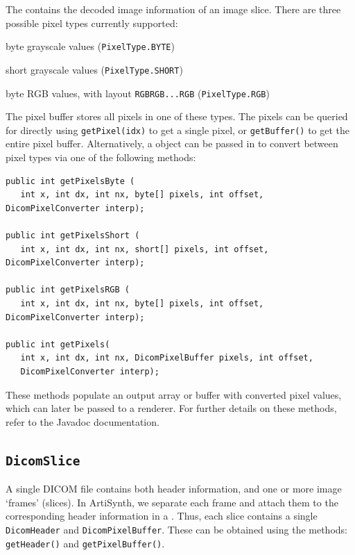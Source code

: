 The  contains the decoded image information of an image slice.
There are three possible pixel types currently supported:
\begin{tightemize}
   \item byte grayscale values (\lstinline{PixelType.BYTE})
   \item short grayscale values (\lstinline{PixelType.SHORT})
   \item byte RGB values, with layout \lstinline{RGBRGB...RGB} (\lstinline{PixelType.RGB})
\end{tightemize}
The pixel buffer stores all pixels in one of these types.  The pixels can be queried for directly
using \lstinline{getPixel(idx)} to get a single pixel, or \lstinline{getBuffer()} to get the
entire pixel buffer.  Alternatively, a  object
can be passed in to convert between pixel types via one of the following methods:
\begin{lstlisting}[]
public int getPixelsByte (
   int x, int dx, int nx, byte[] pixels, int offset, DicomPixelConverter interp);

public int getPixelsShort (
   int x, int dx, int nx, short[] pixels, int offset, DicomPixelConverter interp);

public int getPixelsRGB (
   int x, int dx, int nx, byte[] pixels, int offset, DicomPixelConverter interp);

public int getPixels(
   int x, int dx, int nx, DicomPixelBuffer pixels, int offset, 
   DicomPixelConverter interp);
\end{lstlisting}
These methods populate an output array or buffer with converted pixel values, which can later
be passed to a renderer.  For further details on these methods, refer to the Javadoc documentation.

\subsection{\texttt{DicomSlice}}

A single DICOM file contains both header information, and one or more image `frames' (slices).  In
ArtiSynth, we separate each frame and attach them to the corresponding header information in
a .  Thus, each slice contains a single \lstinline{DicomHeader} and 
\lstinline{DicomPixelBuffer}.  These can be obtained using the methods: \lstinline{getHeader()} and
\lstinline{getPixelBuffer()}.  

